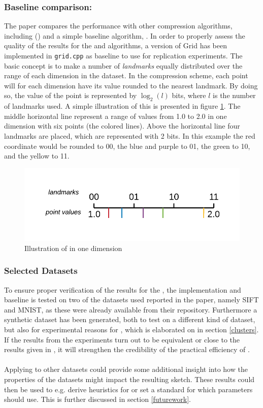 \subsubsection{Baseline comparison: \gr{}}
\label{baseline}
The paper compares the \qs{} performance with other compression algorithms, including (\pq{}) and a simple baseline algorithm, \gr{}. In order to properly assess the quality of the results for the \qs{} and \qsr{} algorithms, a version of Grid has been implemented in \texttt{grid.cpp} as baseline to use for replication experiments. The basic concept is to make a number of \textit{landmarks} equally distributed over the range of each dimension in the dataset. In the compression scheme, each point will for each dimension have its value rounded to the nearest landmark. By doing so, the value of the point is represented by $\log_2(l)$ bits, where $l$ is the number of landmarks used. A simple illustration of this is presented in figure \ref{landmarks}. The middle horizontal line represent a range of values from 1.0 to 2.0 in one dimension with six points (the colored lines). Above the horizontal line four landmarks are placed, which are represented with 2 bits. In this example the red coordinate would be rounded to 00, the blue and purple to 01, the green to 10, and the yellow to 11.

\begin{figure}[h]
	\centering
	\includegraphics[width=\textwidth]{figures/Landmarks.png}
	\caption{Illustration of \gr{} in one dimension}
	\label{landmarks}
\end{figure}

\subsubsection{Selected Datasets}
\label{datasets}
To ensure proper verification of the results for the \qs{}, the implementation and baseline is tested on two of the datasets used reported in the paper, namely SIFT and MNIST, as these were already available from their repository. Furthermore a synthetic dataset has been generated, both to test \qs{} on a different kind of dataset, but also for experimental reasons for \qsr{}, which is elaborated on in section \ref{clusters}. If the results from the experiments turn out to be equivalent or close to the results given in \cite{wagner17}, it will strengthen the credibility of the practical efficiency of \qs{}.
\\
\\
Applying \qs{} to other datasets could provide some additional insight into how the properties of the datasets might impact the resulting sketch. These results could then be used to e.g. derive heuristics for \qs{} or set a standard for which parameters \qs{} should use. This is further discussed in section \ref{futurework}.

